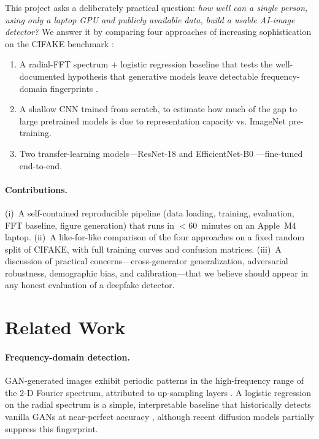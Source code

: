 \documentclass{article}
\begin{document}
This project asks a deliberately practical question: \emph{how well can
a single person, using only a laptop GPU and publicly available data,
build a usable AI-image detector?} We answer it by comparing four
approaches of increasing sophistication on the \textsc{CIFAKE}
benchmark \citep{bird2024cifake}:

\begin{enumerate}\itemsep0.15em
  \item A radial-FFT spectrum + logistic regression baseline that
        tests the well-documented hypothesis that generative models
        leave detectable frequency-domain fingerprints
        \citep{frank2020leveraging, durall2020watch}.
  \item A shallow CNN trained from scratch, to estimate how much of
        the gap to large pretrained models is due to representation
        capacity vs. ImageNet pre-training.
  \item Two transfer-learning models---\mbox{ResNet-18}
        \citep{he2016resnet} and \mbox{EfficientNet-B0}
        \citep{tan2019efficientnet}---fine-tuned end-to-end.
\end{enumerate}

\paragraph{Contributions.}
(i)~A self-contained reproducible pipeline (data loading, training,
evaluation, FFT baseline, figure generation) that runs in
\(<\)60~minutes on an Apple~M4 laptop.
(ii)~A like-for-like comparison of the four approaches on a fixed
random split of \textsc{CIFAKE}, with full training curves and
confusion matrices.
(iii)~A discussion of practical concerns---cross-generator
generalization, adversarial robustness, demographic bias, and
calibration---that we believe should appear in any honest evaluation
of a deepfake detector.

\section{Related Work}
\label{sec:related}

\paragraph{Frequency-domain detection.}
GAN-generated images exhibit periodic patterns in the high-frequency
range of the 2-D Fourier spectrum, attributed to up-sampling layers
\citep{frank2020leveraging,durall2020watch}. A logistic regression on
the radial spectrum is a simple, interpretable baseline that
historically detects vanilla GANs at near-perfect accuracy
\citep{wang2020cnnspot}, although recent diffusion models partially
suppress this fingerprint.
\end{document}
